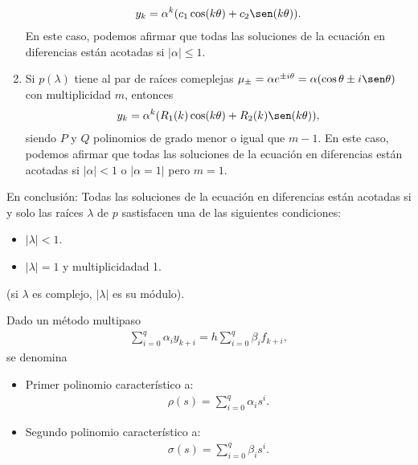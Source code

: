 \begin{enumerate}
          \begin{align*}
              y_k = \alpha^k(c_1 \cos(k\theta) + c_2 \sen(k\theta)).
          \end{align*}
          En este caso, podemos afirmar que todas las soluciones de la ecuación en diferencias están acotadas si $|\alpha| \leq 1$.
    \item Si $p(\lambda)$ tiene al par de raíces comeplejas $\mu_{\pm} = \alpha e^{\pm i \theta} = \alpha(\cos \theta \pm i\sen\theta)$ con multiplicidad $m$, entonces
          \begin{align*}
              y_k = \alpha^k(R_1(k)\cos(k\theta) + R_2(k)\sen(k\theta)),
          \end{align*}
          siendo $P$ y $Q$ polinomios de grado menor o igual que $m-1$. En este caso, podemos afirmar que todas las soluciones de la ecuación en diferencias están acotadas si $|\alpha| < 1$ o $|\alpha = 1|$ pero $m = 1$.

\end{enumerate}
En conclusión: Todas las soluciones de la ecuación en diferencias están acotadas si y solo las raíces $\lambda$ de $p$ sastisfacen una de las siguientes condiciones:
\begin{itemize}
    \item $|\lambda| < 1$.
    \item $|\lambda| = 1$ y multiplicidadad 1.
\end{itemize}
(si $\lambda$ es complejo, $|\lambda|$ es su módulo).

\begin{defi}
    Dado un método multipaso
    \begin{align*}
        \sum_{i=0}^{q} \alpha_i y_{k+i} = h\sum_{i=0}^{q} \beta_i f_{k+i},
    \end{align*}
    se denomina
    \begin{itemize}
        \item Primer polinomio característico a:
              \begin{align*}
                  \rho(s) = \sum_{i=0}^{q} \alpha_i s^i.
              \end{align*}
        \item Segundo polinomio característico a:
              \begin{align*}
                  \sigma(s) = \sum_{i=0}^{q} \beta_i s^i.
              \end{align*}
    \end{itemize}
\end{defi}

